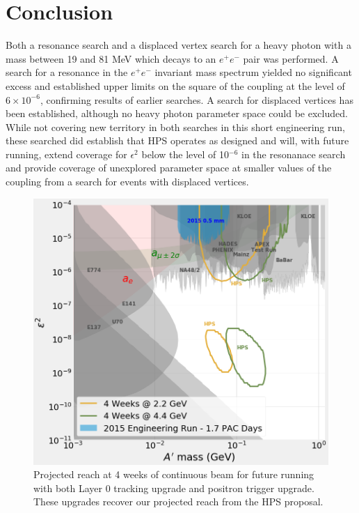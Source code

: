 \documentclass[twocolumn, showpacs, preprintnumbers,prd, superscriptaddress]{revtex4-1}
\newcommand{\pos}{e^{+}}
\newcommand{\ele}{e^{-}}
\newcommand{\epem}{\pos\ele}
\begin{document}
	\section{Conclusion} \label{sec:conclusions}
        	
	Both a resonance search and a displaced vertex search for a heavy photon with a mass between 19 and 81 MeV
        which decays to an $\epem$ pair was performed.  A search for a resonance in
        the $\epem$ invariant mass spectrum yielded no significant excess and 
        established upper limits on the square of the coupling at the level of
        $6\times10^{-6}$, confirming results of earlier searches. A search for displaced vertices has been established, although no heavy photon parameter space could be excluded. While not
        covering new territory in both searches in this short engineering run, these searched did
        establish that HPS operates as designed and will, with future running,
        extend coverage for $\epsilon^2$ below the level of 10$^{-6}$ in the resonanace search and provide coverage
        of unexplored parameter space at smaller values of the coupling from a search for events with displaced vertices.

        \begin{figure}[th]
            \centering
            \includegraphics[width=.9\linewidth]{figs/reach_upgrade.png}
            \caption{
                Projected reach at 4 weeks of continuous beam for future running with both Layer 0 tracking upgrade and positron trigger upgrade. These upgrades recover our projected reach from the HPS proposal.}
            \label{fig:reach}
        \end{figure}
\end{document}
